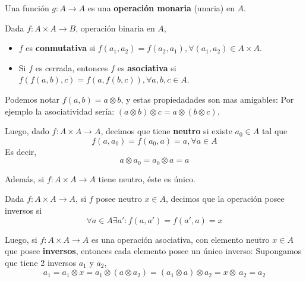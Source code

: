 \documentclass[11pt,a4paper]{article}
\begin{document}
Una funci\'on $g : A \rightarrow A$ es una \textbf{operaci\'on monaria} (unaria) en $A$.\\

\noindent \dotfill


Dada $f: A \times A \rightarrow B$, operaci\'on binaria en $A$, 
\begin{itemize}
\item $f$ es \textbf{conmutativa} si $f(a_1, a_2) = f(a_2, a_1), \forall (a_1, a_2) \in A \times A$.
\item Si $f$ es cerrada, entonces $f$ es \textbf{asociativa} si $f(f(a,b), c) = f(a,f(b,c)), \forall a,b,c \in A$.
\end{itemize}
Podemos notar $f(a,b) = a \otimes b$, y estas propiedadades son mas amigables: Por ejemplo la asociatividad ser\'ia: $(a \otimes b) \otimes c = a \otimes (b \otimes c)$.\\

\noindent \dotfill

Luego, dado $f : A \times A \rightarrow A$, decimos que tiene \textbf{neutro} si existe $a_0 \in A$ tal que $$f(a, a_0) = f(a_0, a) = a, \forall a \in A$$
Es decir, $$a \otimes a_0 = a_0 \otimes a = a$$

Adem\'as, si $f : A \times A \rightarrow A$ tiene neutro, \'este es \'unico.\\

\noindent \dotfill

Dada $f : A \times A \rightarrow A$, si $f$ posee neutro $x \in A$, decimos que la operaci\'on posee inversos si $$\forall a \in A \exists a' : f(a, a') = f(a', a) = x$$

Luego, si $f : A \times A \rightarrow A$ es una operaci\'on asociativa, con elemento neutro $x \in A$ que posee \textbf{inversos}, entonces cada elemento posee un \'unico inverso: Supongamos que tiene 2 inversos $a_1$ y $a_2$, $$a_1 = a_1 \otimes x = a_1 \otimes (a \otimes a_2) = (a_1 \otimes a) \otimes a_2 = x \otimes\ a_2 = a_2$$

\noindent \dotfill
\end{document}
